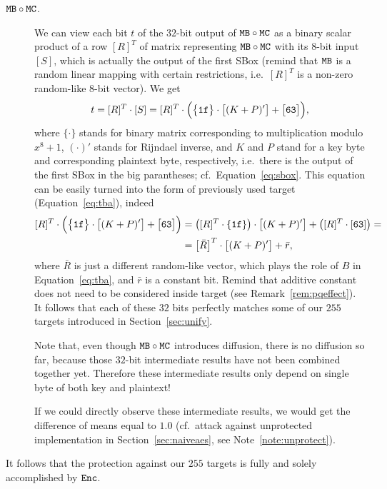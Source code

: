 \begin{description}
	\item[$\texttt{MB}\circ\texttt{MC}$.] We can view each bit $t$ of the $32$-bit output of $\texttt{MB}\circ\texttt{MC}$ as a binary scalar product of a row $[R]^T$ of matrix representing $\texttt{MB}\circ\texttt{MC}$ with its $8$-bit input $[S]$, which is actually the output of the first SBox (remind that $\texttt{MB}$ is a random linear mapping with certain restrictions, i.e.\ $[R]^T$ is a non-zero random-like $8$-bit vector). We get
	\begin{equation*}
		t = [R]^T\cdot [S] = [R]^T\cdot\Bigl( \bigl\{\texttt{1f}\bigr\}\cdot\bigl[(K+P)'\bigr] + \bigl[\texttt{63}\bigr] \Bigr) ,
	\end{equation*}
	where $\{\cdot\}$ stands for binary matrix corresponding to multiplication modulo $x^8+1$, $(\cdot)'$ stands for Rijndael inverse, and $K$ and $P$ stand for a key byte and corresponding plaintext byte, respectively, i.e.\ there is the output of the first SBox in the big parantheses; cf.\ Equation~\ref{eq:sbox}. This equation can be easily turned into the form of previously used target (Equation~\ref{eq:tba}), indeed
	\begin{align}
	\label{eq:mbmctarget}
		[R]^T\cdot\Bigl( \bigl\{\texttt{1f}\bigr\}\cdot\bigl[(K+P)'\bigr] + \bigl[\texttt{63}\bigr] \Bigr) &= \bigl([R]^T\cdot \{\texttt{1f}\}\bigr)\cdot\bigl[(K+P)'\bigr] + \bigl([R]^T\cdot [\texttt{63}]\bigr) = \nonumber \\
		&= \bigl[\bar R\bigr]^T \cdot \bigl[(K+P)'\bigr] + \bar r ,
	\end{align}
	where $\bar R$ is just a different random-like vector, which plays the role of $B$ in Equation~\ref{eq:tba}, and $\bar r$ is a constant bit. Remind that additive constant does not need to be considered inside target (see Remark~\ref{rem:pqeffect}). It follows that each of these $32$ bits perfectly matches some of our $255$ targets introduced in Section~\ref{sec:unify}.
	
	Note that, even though $\texttt{MB}\circ\texttt{MC}$ introduces diffusion, there is no diffusion so far, because those $32$-bit intermediate results have not been combined together yet. Therefore these intermediate results only depend on single byte of both key and plaintext!
	
	If we could directly observe these intermediate results, we would get the difference of means equal to $1.0$ (cf.\ attack against unprotected implementation in Section~\ref{sec:naiveaes}, see Note~\ref{note:unprotect}).
\end{description}
\begin{remark}
\label{rem:enc}
	It follows that the protection against our $255$ targets is fully and solely accomplished by $\texttt{Enc}$.
\end{remark}
